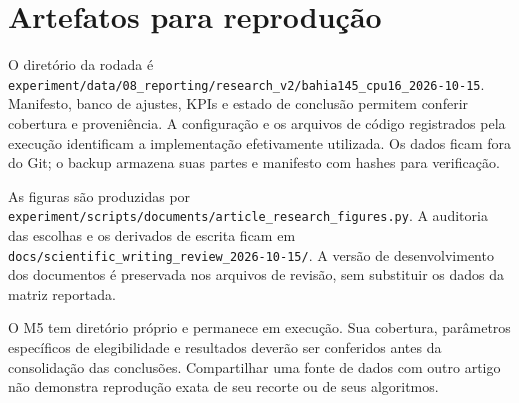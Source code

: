 \section{Artefatos para reprodução}

O diretório da rodada é \nolinkurl{experiment/data/08_reporting/research_v2/bahia145_cpu16_2026-10-15}. Manifesto, banco de ajustes, KPIs e estado de conclusão permitem conferir cobertura e proveniência. A configuração e os arquivos de código registrados pela execução identificam a implementação efetivamente utilizada. Os dados ficam fora do Git; o backup armazena suas partes e manifesto com hashes para verificação.

As figuras são produzidas por \nolinkurl{experiment/scripts/documents/article_research_figures.py}. A auditoria das escolhas e os derivados de escrita ficam em \nolinkurl{docs/scientific_writing_review_2026-10-15/}. A versão de desenvolvimento dos documentos é preservada nos arquivos de revisão, sem substituir os dados da matriz reportada.

O M5 tem diretório próprio e permanece em execução. Sua cobertura, parâmetros específicos de elegibilidade e resultados deverão ser conferidos antes da consolidação das conclusões. Compartilhar uma fonte de dados com outro artigo não demonstra reprodução exata de seu recorte ou de seus algoritmos.
